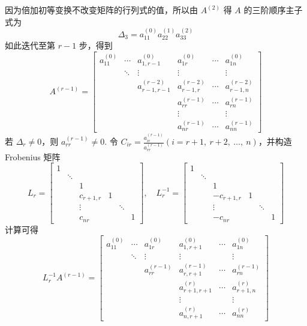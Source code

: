             因为倍加初等变换不改变矩阵的行列式的值，所以由 $A^{(2)}$ 得 $A$ 的三阶顺序主子式为
            \begin{equation*}
                \Delta_3 = a_{11}^{(0)}a_{22}^{(1)}a_{33}^{(2)}
            \end{equation*}
            如此迭代至第 $r-1$ 步，得到
            \begin{equation*}
                A^{(r-1)} = \begin{bmatrix}
                    a_{11}^{(0)} & \cdots & a_{1,r-1}^{(0)} & a_{1r}^{(0)} & \cdots & a_{1n}^{(0)} \\ & \ddots & \vdots & \vdots & & \vdots \\ & & a_{r-1,r-1}^{(r-2)} & a_{r-1,r}^{(r-2)} & \cdots & a_{r-1,n}^{(r-2)} \\ & & & a_{rr}^{(r-1)} & \cdots & a_{rn}^{(r-1)} \\ & & & \vdots & & \vdots \\ & & & a_{nr}^{(r-1)} & \cdots & a_{nn}^{(r-1)}
                \end{bmatrix}
            \end{equation*}
            若 $\Delta_r \ne 0$，则 $a_{rr}^{(r-1)} \ne 0$. 令 $C_{ir} = \frac{a_{ir}^{(r-1)}}{a_{rr}^{(r-1)}}(i = r + 1, \ r + 2, \ \dots, \ n)$，并构造 Frobenius 矩阵
            \begin{equation*}
                L_r = \begin{bmatrix}
                    1 & & & & & \\ & \ddots & & & & \\ & & 1 & & & \\ & & c_{r+1,r} & 1 & & \\ & & \vdots & & \ddots & \\ & & c_{nr} & & & 1
                \end{bmatrix}, \quad L_r^{-1} = \begin{bmatrix}
                    1 & & & & & \\ & \ddots & & & & \\ & & 1 & & & \\ & & -c_{r+1,r} & 1 & & \\ & & \vdots & & \ddots & \\ & & -c_{nr} & & & 1
                \end{bmatrix}
            \end{equation*}
            计算可得
            \begin{equation*}
                L_r^{-1}A^{(r-1)} = \begin{bmatrix}
                    a_{11}^{(0)} & \cdots & a_{1r}^{(0)} & a_{1,r+1}^{(0)} & \cdots & a_{1n}^{(0)} \\ & \ddots & \vdots & \vdots & & \vdots \\ & & a_{rr}^{(r-1)} & a_{r,r+1}^{(r-1)} & \cdots & a_{rn}^{(r-1)} \\ & & & a_{r+1,r+1}^{(r)} & \cdots & a_{r+1,n}^{(r)} \\ & & & \vdots & & \vdots \\ & & & a_{n,r+1}^{(r)} & \cdots & a_{nn}^{(r)}
                \end{bmatrix}
            \end{equation*}
